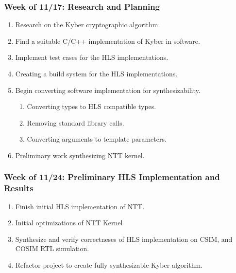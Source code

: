 \subsubsection*{Week of 11/17: Research and Planning}
\begin{enumerate}
  \item Research on the Kyber cryptographic algorithm. \hfill \texttt{}
  \item Find a suitable C/C++ implementation of Kyber in software.\hfill \texttt{}
  \item Implement test cases for the HLS implementations.\hfill \texttt{}
  \item Creating a build system for the HLS implementations.\hfill \texttt{}
  \item Begin converting software implementation for synthesizability.
        \begin{enumerate}
          \item Converting types to HLS compatible types.\hfill \texttt{}
          \item Removing standard library calls.\hfill \texttt{}
          \item Converting arguments to template parameters. \hfill \texttt{}
        \end{enumerate}
  \item Preliminary work synthesizing NTT kernel.\hfill \texttt{}
\end{enumerate}
\subsubsection*{Week of 11/24: Preliminary HLS Implementation and Results}
\begin{enumerate}
  \item Finish initial HLS implementation of NTT. \hfill \texttt{}
  \item Initial optimizations of NTT Kernel \hfill \texttt{}
  \item Synthesize and verify correctneses of HLS implementation on CSIM, and COSIM RTL simulation. \hfill \texttt{}
  \item Refactor project to create fully synthesizable Kyber algorithm. \hfill \texttt{}
\end{enumerate}
